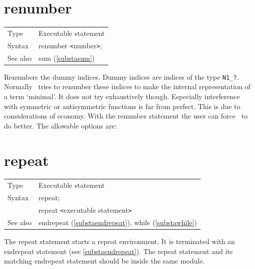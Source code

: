 \section{renumber}
\label{substarenumber}

\noindent \begin{tabular}{ll}
Type & Executable statement\\
Syntax & renumber {\tt<}number{\tt>};
\\ See also & sum (\ref{substasum})
\end{tabular}\vspace{4mm}

\noindent Renumbers the dummy 
indices. Dummy indices are indices of the type 
\verb:N1_?:. Normally \FORM\ tries to renumber these indices to make the 
internal representation of a term `minimal'. It does not try exhaustively 
though. Especially interference with symmetric or antisymmetric functions 
is far from perfect. This is due to considerations of economy. With the 
renumber statement the user can force \FORM\ to do better. The allowable 
options are:


\vspace{10mm}


\section{repeat}
\label{substarepeat}

\noindent \begin{tabular}{ll}
Type & Executable statement\\
Syntax & repeat; \\
       & repeat {\tt<}executable statement{\tt>}
\\ See also & endrepeat (\ref{substaendrepeat}), while (\ref{substawhile})
\end{tabular} \vspace{4mm}

\noindent The repeat statement starts a
repeat environment. It is terminated with an 
endrepeat statement (see \ref{substaendrepeat}). The 
repeat statement and its matching endrepeat statement should be inside the 
same module. \vspace{4mm}

